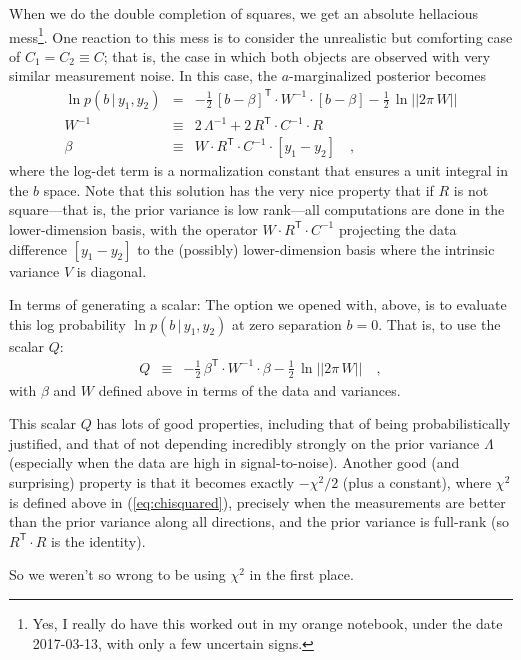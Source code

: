 \documentclass[12pt,letterpaper]{article}
\newcommand{\transpose}[1]{{#1}^{\mathsf{T}}}
\newcommand{\inverse}[1]{{#1}^{-1}}
\renewcommand{\det}[1]{||{#1}||}
\newcommand{\given}{\,|\,}
\begin{document}
When we do the double completion of squares, we get an absolute
hellacious mess\footnote{Yes, I really do have this worked out in my
  orange notebook, under the date 2017-03-13, with only a few
  uncertain signs.}.
One reaction to this mess is to consider the
unrealistic but comforting case of $C_1=C_2\equiv C$; that is, the case in
which both objects are observed with very similar measurement noise.
In this case, the $a$-marginalized posterior becomes
\begin{eqnarray}
\ln p(b\given y_1,y_2) &=&
  -\frac{1}{2}\,\transpose{[b-\beta]}\cdot\inverse{W}\cdot [b-\beta]
  -\frac{1}{2}\,\ln\det{2\pi\,W} \\
\inverse{W} &\equiv&
  2\,\inverse{\Lambda} + 2\,\transpose{R}\cdot\inverse{C}\cdot R \\
\beta &\equiv&
  W\cdot\transpose{R}\cdot\inverse{C}\cdot [y_1 - y_2]
\quad ,
\end{eqnarray}
where the log-det term is a normalization constant that ensures a unit
integral in the $b$ space. Note that this solution has the very nice
property that if $R$ is not square---that is, the prior variance is
low rank---all computations are done in the lower-dimension basis,
with the operator $W\cdot\transpose{R}\cdot\inverse{C}$ projecting the
data difference $[y_1-y_2]$ to the (possibly) lower-dimension basis
where the intrinsic variance $V$ is diagonal.

In terms of generating a scalar: The option we opened with, above, is
to evaluate this log probability $\ln p(b\given y_1,y_2)$ at zero
separation $b=0$. That is, to use the scalar $Q$:
\begin{eqnarray}
Q &\equiv&
  -\frac{1}{2}\,\transpose{\beta}\cdot\inverse{W}\cdot\beta
  -\frac{1}{2}\,\ln\det{2\pi\,W} \quad ,
\end{eqnarray}
with $\beta$ and $W$ defined above in terms of the data and variances.

This scalar $Q$ has lots of good properties, including that of being
probabilistically justified, and that of not depending incredibly
strongly on the prior variance $\Lambda$ (especially when the data are
high in signal-to-noise). Another good (and surprising) property is
that it becomes exactly $-\chi^2/2$ (plus a constant), where $\chi^2$
is defined above in (\ref{eq:chisquared}), precisely when the
measurements are better than the prior variance along all directions,
and the prior variance is full-rank (so $\transpose{R}\cdot R$ is the
identity).

So we weren't so wrong to be using $\chi^2$ in the first place.
\end{document}
